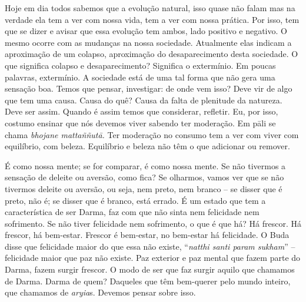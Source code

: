 Hoje em dia todos sabemos que a evolução natural, isso quase não
falam mas na verdade ela tem a ver com nossa vida, tem a ver com nossa
prática. Por isso, tem que se dizer e avisar que essa evolução tem
ambos, lado positivo e negativo. O mesmo ocorre com as mudanças na
nossa sociedade. Atualmente elas indicam a aproximação de um colapso,
aproximação do desaparecimento desta sociedade. O que significa colapso
e desaparecimento? Significa o extermínio. Em poucas palavras,
extermínio. A sociedade está de uma tal forma que não gera uma sensação
boa. Temos que pensar, investigar: de onde vem isso? Deve vir de algo
que tem uma causa. Causa do quê? Causa da falta de plenitude da
natureza. Deve ser assim. Quando é assim temos que considerar,
refletir. Eu, por isso, costumo ensinar que nós devemos viver sabendo
ter moderação. Em p\=ali se chama \textit{bhojane mattaññut\=a.} Ter
moderação no consumo tem a ver com viver com equilíbrio, com beleza.
Equilíbrio e beleza não têm o que adicionar ou remover. 

É como nossa mente; se for comparar, é como nossa mente. Se não
tivermos a sensação de deleite ou aversão, como fica? Se olharmos,
vamos ver que se não tivermos deleite ou aversão, ou seja, nem preto,
nem branco – se disser que é preto, não é; se disser que é branco, está
errado. É um estado que tem a característica de ser Darma, faz com que
não sinta nem felicidade nem sofrimento. Se não tiver felicidade nem
sofrimento, o que é que há? Há frescor. Há frescor, há bem-estar.
Frescor é bem-estar, no bem-estar há felicidade. O Buda disse que
felicidade maior do que essa não existe, “\textit{natthi santi param
sukham}” – felicidade maior que paz não existe. Paz exterior e
paz mental que fazem parte do Darma, fazem surgir frescor. O modo de
ser que faz surgir aquilo que chamamos de Darma. Darma de quem?
Daqueles que têm bem-querer pelo mundo inteiro, que chamamos de
\textit{aryia}s. Devemos pensar sobre isso. 

